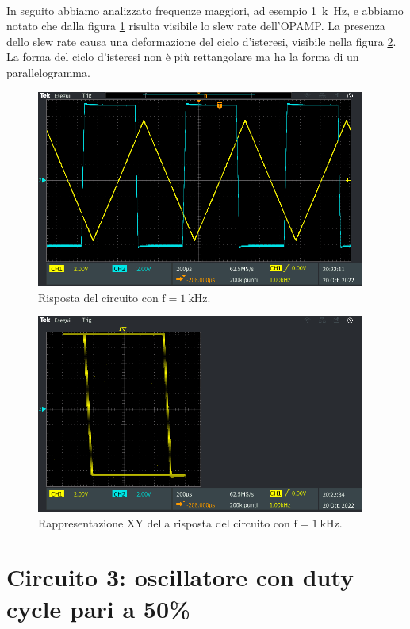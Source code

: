 \documentclass{report}
\begin{document}
\\In seguito abbiamo analizzato frequenze maggiori, ad esempio \SI{1}{k\hertz}, e abbiamo notato che dalla figura \ref{figura:uscita23} risulta visibile lo slew rate dell'OPAMP. La presenza dello slew rate causa una deformazione del ciclo d'isteresi, visibile nella figura \ref{figura:uscita24}. La forma del ciclo d'isteresi non è più rettangolare ma ha la forma di un parallelogramma.
\begin{figure}[h!]
	\centering
	\includegraphics[height=6.5cm]{immagini/TEK00020}
	\caption{Risposta del circuito con $\mathrm{f= \SI{1}{k\hertz}}$.}
	\label{figura:uscita23}
\end{figure}
\begin{figure}[h!]
	\centering
	\includegraphics[height=6.5cm]{immagini/TEK00022}
	\caption{Rappresentazione XY della risposta del circuito con $\mathrm{f= \SI{1}{k\hertz}}$.}
	\label{figura:uscita24}
\end{figure}
\newpage\null\newpage %
\section{Circuito 3: oscillatore con duty cycle pari a 50\%}
\end{document}
